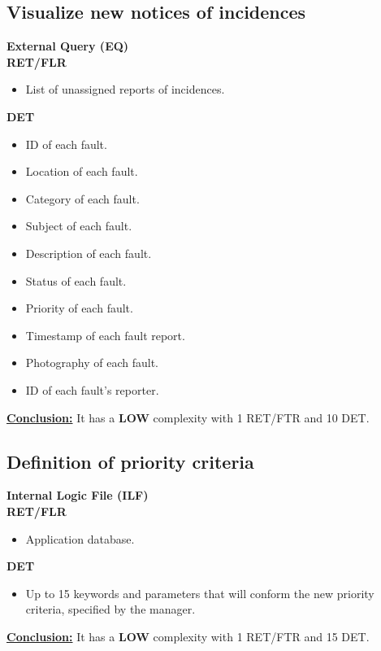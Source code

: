\subsection{Visualize new notices of incidences}
\textbf{External Query (EQ)} \\ 
\textbf{RET/FLR}
\begin{itemize}
\item List of unassigned reports of incidences.
\end{itemize}
\textbf{DET}
\begin{itemize}
\item ID of each fault.
\item Location of each fault.
\item Category of each fault.
\item Subject of each fault.
\item Description of each fault.
\item Status of each fault.
\item Priority of each fault.
\item Timestamp of each fault report.
\item Photography of each fault.
\item ID of each fault's reporter.
\end{itemize}
\textbf{\underline{Conclusion:}} It has a \textbf{LOW} complexity with 1 RET/FTR and 10 DET.

\subsection{Definition of priority criteria}
\textbf{Internal Logic File (ILF)} \\ 
\textbf{RET/FLR}
\begin{itemize}
\item Application database.
\end{itemize}
\textbf{DET}
\begin{itemize}
\item Up to 15 keywords and parameters that will conform the new priority criteria, specified by the manager.
\end{itemize}
\textbf{\underline{Conclusion:}} It has a \textbf{LOW} complexity with 1 RET/FTR and 15 DET.


